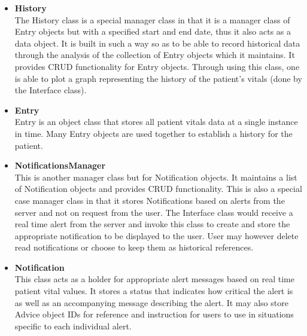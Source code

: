 \begin{itemize}
  	\item \textbf{History}\\
	The History class is a special manager class in that it is a manager class of Entry objects but with a specified start and end date, thus it also acts as a data object. It is built in such a way so as to be able to record historical data through the analysis of the collection of Entry objects which it maintains. It provides CRUD functionality for Entry objects. Through using this class, one is able to plot a graph representing the history of the patient's vitals (done by the Interface class). 
  	\item \textbf{Entry}\\
	Entry is an object class that stores all patient vitals data at a single instance in time. Many Entry objects are used together to establish a history for the patient. 
  	\item \textbf{NotificationsManager}\\
	This is another manager class but for Notification objects. It maintains a list of Notification objects and provides CRUD functionality. This is also a special case manager class in that it stores Notifications based on alerts from the server and not on request from the user. The Interface class would receive a real time alert from the server and invoke this class to create and store the appropriate notification to be displayed to the user. User may however delete read notifications or choose to keep them as historical references. 
  	\item \textbf{Notification}\\
	This class acts as a holder for appropriate alert messages based on real time patient vital values. It stores a status that indicates how critical the alert is as well as an accompanying message describing the alert. It may also store Advice object IDs for reference and instruction for users to use in situations specific to each individual alert.
\end{itemize}

